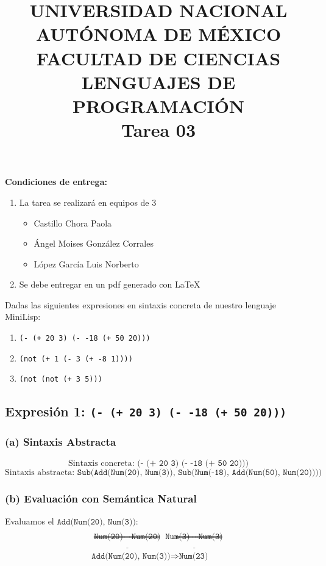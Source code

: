 \documentclass[12pt,letterpaper]{article}
\title{
		\vspace{-0.7in} 	
		\usefont{OT1}{bch}{b}{n}
		
		\begin{minipage}{3cm}
        \vspace{-0.5in} 	
    	\begin{center}
    		
    	\end{center}
    \end{minipage}\hfill
    \begin{minipage}{10.7cm}
    	\begin{center}

\normalfont \normalsize \textsc{UNIVERSIDAD NACIONAL AUTÓNOMA DE MÉXICO \\ FACULTAD DE CIENCIAS \\ LENGUAJES DE PROGRAMACIÓN } \\
		\huge Tarea 03

    	\end{center}
     
    \end{minipage}\hfill
    \begin{minipage}{3.2cm}
    \vspace{-0.5in} 
    	\begin{center}
    		
    	\end{center}
    \end{minipage}

\author{}
\date{}

}
\begin{document}
\maketitle

\textbf{Condiciones de entrega:}

\begin{enumerate}
    \item La tarea se realizará en equipos de 3
    \begin{itemize}
        \item Castillo Chora Paola
        \item Ángel Moises González Corrales
        \item López García Luis Norberto
    \end{itemize}
    \item Se debe entregar en un pdf generado con \LaTeX
\end{enumerate}

\vspace{1cm}


Dadas las siguientes expresiones en sintaxis concreta de nuestro lenguaje MiniLisp:

\begin{enumerate}
    \item \texttt{(- (+ 20 3) (- -18 (+ 50 20)))}
    \item \texttt{(not (+ 1 (- 3 (+ -8 1))))}
    \item \texttt{(not (not (+ 3 5)))}
\end{enumerate}

\subsection*{Expresión 1: \texttt{(- (+ 20 3) (- -18 (+ 50 20)))}}

\subsubsection*{(a) Sintaxis Abstracta}
\[ \text{Sintaxis concreta: } \texttt{(- (+ 20 3) (- -18 (+ 50 20)))} \]
\[ \text{Sintaxis abstracta: } \texttt{Sub(Add(Num(20), Num(3)), Sub(Num(-18), Add(Num(50), Num(20))))} \]

\subsubsection*{(b) Evaluación con Semántica Natural}

Evaluamos el \(\texttt{Add(Num(20), Num(3))}\):
\[
\begin{array}{c}
\\
\underline{\texttt{Num(20)} \Rightarrow \texttt{Num(20)}}
\underline{\texttt{Num(3)} \Rightarrow \texttt{Num(3)}} \\
\texttt{Add(Num(20), Num(3))} \Rightarrow \texttt{Num(23)}
\end{array}
\]
\end{document}
